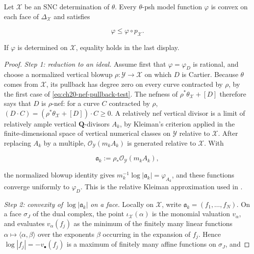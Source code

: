 \begin{lemma}\label{lem:ch21-model-skeletal-properties}
Let \(\mathcal X\) be an SNC determination of \(\theta\).  Every
\(\theta\)-psh model function \(\varphi\) is convex on each face of
\(\Delta_{\mathcal X}\) and satisfies

\[
                 \varphi\leq\varphi\circ p_{\mathcal X}.
\]

If \(\varphi\) is determined on \(\mathcal X\), equality holds in the last
display.
\end{lemma}

\begin{proof}
\emph{Step 1: reduction to an ideal.}  Assume first that
\(\varphi=\varphi_D\) is rational, and choose a normalized
vertical blowup
\(\rho:\mathcal Y\to\mathcal X\) on which \(D\) is Cartier.  Because
\(\theta\) comes from \(\mathcal X\), its pullback has degree zero on every
curve contracted by \(\rho\), by the first case of
\eqref{eq:ch20-nef-pullback-test}.  The nefness of
\(\rho^*\theta_{\mathcal X}+[D]\) therefore says that \(D\) is
\(\rho\)-nef: for a curve \(C\) contracted by \(\rho\),
\((D\cdot C)=(\rho^*\theta_{\mathcal X}+[D])\cdot C\geq0\).  A relatively
nef vertical divisor is a limit of relatively
ample vertical \(\mathbf Q\)-divisors \(A_k\), by Kleiman's criterion
applied in the finite-dimensional space of vertical numerical classes on
\(\mathcal Y\) relative to \(\mathcal X\).  After
replacing \(A_k\) by a
multiple, \(\mathcal O_{\mathcal Y}(m_kA_k)\) is generated relative to
\(\mathcal X\).  With

\[
       \mathfrak a_k:=\rho_*
          \mathcal O_{\mathcal Y}(m_kA_k),
\]

the normalized blowup identity gives
\(m_k^{-1}\log|\mathfrak a_k|=\varphi_{A_k}\), and these functions converge
uniformly to \(\varphi_D\).  This is the relative Kleiman approximation used
in \cite[Lemma~5.3]{BFJ16}.

\emph{Step 2: convexity of \(\log|\mathfrak a_k|\) on a face.}  Locally on
\(\mathcal X\), write \(\mathfrak a_k=(f_1,\ldots,f_N)\).  On a face
\(\sigma_J\) of the dual complex, the point \(\iota_{\mathcal X}(\alpha)\)
is the monomial valuation \(v_\alpha\), and
 evaluates \(v_\alpha(f_j)\) as the minimum of the
finitely many linear functions \(\alpha\mapsto\langle\alpha,\beta\rangle\)
over the exponents \(\beta\) occurring in the expansion of \(f_j\).  Hence
\(\log|f_j|=-v_\bullet(f_j)\) is a maximum of finitely many affine
functions on \(\sigma_J\), and


\end{proof}
